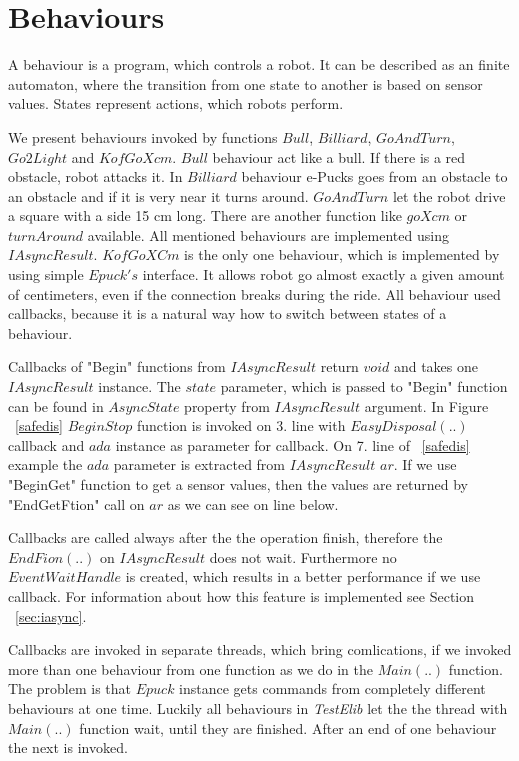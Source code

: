 \section{Behaviours} \label{behaviours}
  A behaviour is a program, which controls a robot. It can be described as an finite automaton, 
  where the transition from one state to another is based on sensor values.
  States represent actions, which robots perform.
  
  We present behaviours invoked by functions $Bull$, $Billiard$, $GoAndTurn$,$Go2Light$ and $KofGoXcm$.
  $Bull$ behaviour act like a bull. If there is a red obstacle, robot attacks it. 
  In $Billiard$ behaviour e-Pucks goes from an obstacle to an obstacle
  and if it is very near it turns around.
  $GoAndTurn$ let the robot drive a square with a side 15 cm long. 
  There are another function like $goXcm$ or $turnAround$ available.
  All mentioned behaviours are implemented using $IAsyncResult$. 
  $KofGoXCm$ is the only one behaviour, which is implemented by using simple $Epuck's$ interface.
  It allows robot go almost exactly a given amount of centimeters, even if the connection breaks during the ride.
  All behaviour used  callbacks, because it is a natural way how to switch between states of a behaviour.

  Callbacks of "Begin" functions from $IAsyncResult$ return $void$ and takes one $IAsyncResult$ instance.
  The $state$ parameter, which is passed to "Begin" function can be found in $AsyncState$ property from $IAsyncResult$ argument.
  In Figure ~\ref{safedis} $BeginStop$ function is invoked on 3. line with $EasyDisposal(..)$ callback 
  and $ada$ instance as parameter for callback.
  On 7. line of ~\ref{safedis} example the $ada$ parameter is extracted from $IAsyncResult$ $ar$.
  If we use "BeginGet" function to get a sensor values, then the values are returned by "EndGetFtion" call on $ar$ as we can see
  on line below.

  Callbacks are called always after the the operation finish, therefore the $EndFion(..)$ on $IAsyncResult$ does not wait.
  Furthermore no $EventWaitHandle$ is created, which results in a better performance if we use callback.
  For information about how this feature is implemented see Section ~\ref{sec:iasync}.

  Callbacks are invoked in separate threads, which bring comlications, if we invoked more than one behaviour
  from one function as we do in the $Main(..)$ function. The problem is that $Epuck$ instance gets 
  commands from completely different behaviours at one time.
  Luckily all behaviours in {\it TestElib} let the the thread with $Main(..)$ function wait, until they are finished.
  After an end of one behaviour the next is invoked.

